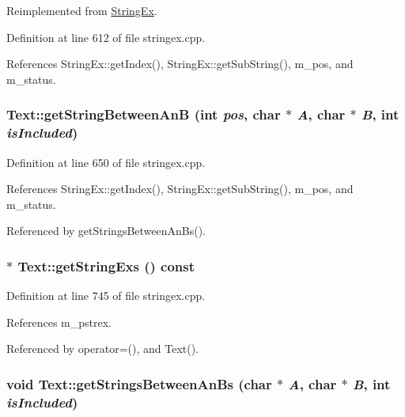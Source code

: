 Reimplemented from \hyperlink{classStringEx_76f316d1d3db65232f5ad8224ab3db9c}{StringEx}.

Definition at line 612 of file stringex.cpp.

References StringEx::getIndex(), StringEx::getSubString(), m\_\-pos, and m\_\-status.\hypertarget{classText_94ffb3fc0b16c0404415b16e9f29c0aa}{
\subsubsection[{getStringBetweenAnB}]{ Text::getStringBetweenAnB (int {\em pos}, \/  char $\ast$ {\em A}, \/  char $\ast$ {\em B}, \/  int {\em isIncluded})}}
\label{classText_94ffb3fc0b16c0404415b16e9f29c0aa}




Definition at line 650 of file stringex.cpp.

References StringEx::getIndex(), StringEx::getSubString(), m\_\-pos, and m\_\-status.

Referenced by getStringsBetweenAnBs().\hypertarget{classText_b5914b3a33faf887c6a734cad528cc55}{
\subsubsection[{getStringExs}]{ $\ast$ Text::getStringExs () const}}
\label{classText_b5914b3a33faf887c6a734cad528cc55}




Definition at line 745 of file stringex.cpp.

References m\_\-pstrex.

Referenced by operator=(), and Text().\hypertarget{classText_c1b92f62e2178448e32dd96a08100c94}{
\subsubsection[{getStringsBetweenAnBs}]{\setlength{\rightskip}{0pt plus 5cm}void Text::getStringsBetweenAnBs (char $\ast$ {\em A}, \/  char $\ast$ {\em B}, \/  int {\em isIncluded})}}
\label{classText_c1b92f62e2178448e32dd96a08100c94}




